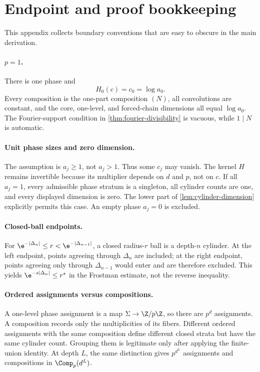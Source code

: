 \section{Endpoint and proof bookkeeping}
\label{app:bookkeeping}

This appendix collects boundary conventions that are easy to obscure in the
main derivation.

\paragraph{$p=1$.}
There is one phase and
\[
 H_0(c)=c_0=\log a_0.
\]
Every composition is the one-part composition $(N)$, all convolutions are
constant, and the core, one-level, and forced-chain dimensions all equal
$\log a_0$.  The Fourier-support condition in
\cref{thm:fourier-divisibility} is vacuous, while $1\mid N$ is automatic.

\paragraph{Unit phase sizes and zero dimension.}
The assumption is $a_j\geq1$, not $a_j>1$.  Thus some $c_j$ may vanish.  The
kernel $H$ remains invertible because its multiplier depends on $d$ and $p$,
not on $c$.  If all $a_j=1$, every admissible phase stratum is a singleton,
all cylinder counts are one, and every displayed dimension is zero.  The
lower part of \cref{lem:cylinder-dimension} explicitly permits this case.
An empty phase $a_j=0$ is excluded.

\paragraph{Closed-ball endpoints.}
For
$\e^{-|\Delta_n|}\leq r<\e^{-|\Delta_{n-1}|}$, a closed radius-$r$ ball is a
depth-$n$ cylinder.  At the left endpoint, points agreeing through
$\Delta_n$ are included; at the right endpoint, points agreeing only through
$\Delta_{n-1}$ would enter and are therefore excluded.  This yields
$\e^{-s|\Delta_n|}\leq r^s$ in the Frostman estimate, not the reverse
inequality.

\paragraph{Ordered assignments versus compositions.}
A one-level phase assignment is a map $\Sigma\to\Z/p\Z$, so there are $p^d$
assignments.  A composition records only the multiplicities of its fibers.
Different ordered assignments with the same composition define different
closed strata but have the same cylinder count.  Grouping them is legitimate
only after applying the finite-union identity.  At depth $L$, the same
distinction gives $p^{d^L}$ assignments and compositions in
$\Comp_p(d^L)$.

